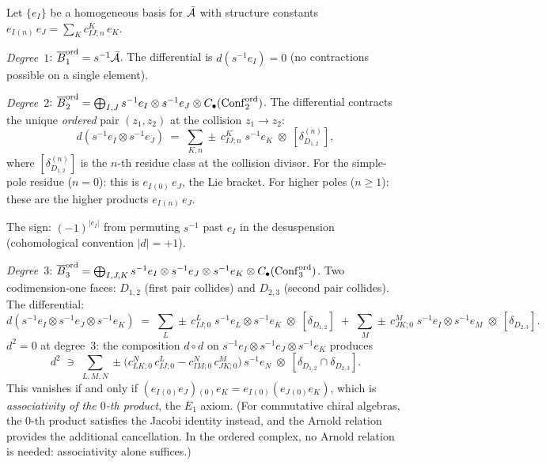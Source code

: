 \begin{construction}
\label{constr:ordered-bar-low-degree}
Let $\{e_I\}$ be a homogeneous basis for $\bar{\mathcal{A}}$ with
structure constants $e_I{}_{(n)}\,e_J=\sum_K c^K_{IJ;n}\,e_K$.

\emph{Degree~$1$}: $\overline{B}^{\mathrm{ord}}_1=s^{-1}\bar{\mathcal{A}}$.
The differential is $d(s^{-1}e_I)=0$ (no contractions
possible on a single element).

\emph{Degree~$2$}: $\overline{B}^{\mathrm{ord}}_2
=\bigoplus_{I,J}s^{-1}e_I\otimes s^{-1}e_J\otimes
C_\bullet(\mathrm{Conf}_2^{\mathrm{ord}})$.
The differential contracts the unique \emph{ordered} pair
$(z_1,z_2)$ at the collision $z_1\to z_2$:
\begin{equation}\label{eq:ordered-bar-d2}
d(s^{-1}e_I\otimes s^{-1}e_J)
\;=\;
\sum_{K,n}\pm\,c^K_{IJ;n}\;s^{-1}e_K
\;\otimes\;
[\delta_{D_{1,2}}^{(n)}],
\end{equation}
where $[\delta_{D_{1,2}}^{(n)}]$ is the $n$-th residue class
at the collision divisor. For the simple-pole residue
($n=0$): this is $e_I{}_{(0)}\,e_J$, the Lie bracket.
For higher poles ($n\ge 1$): these are the higher products
$e_I{}_{(n)}\,e_J$.

The sign: $(-1)^{|e_I|}$ from permuting $s^{-1}$ past
$e_I$ in the desuspension (cohomological convention
$|d|=+1$).

\emph{Degree~$3$}: $\overline{B}^{\mathrm{ord}}_3
=\bigoplus_{I,J,K}s^{-1}e_I\otimes s^{-1}e_J\otimes
s^{-1}e_K\otimes
C_\bullet(\mathrm{Conf}_3^{\mathrm{ord}})$.
Two codimension-one faces: $D_{1,2}$ (first pair collides)
and $D_{2,3}$ (second pair collides). The differential:
\begin{equation}\label{eq:ordered-bar-d3}
d(s^{-1}e_I\otimes s^{-1}e_J\otimes s^{-1}e_K)
\;=\;
\sum_L\pm\,c^L_{IJ;0}\;
s^{-1}e_L\otimes s^{-1}e_K
\;\otimes\;[\delta_{D_{1,2}}]
\;+\;
\sum_M\pm\,c^M_{JK;0}\;
s^{-1}e_I\otimes s^{-1}e_M
\;\otimes\;[\delta_{D_{2,3}}].
\end{equation}
$d^2=0$ at degree~$3$: the composition $d\circ d$ on
$s^{-1}e_I\otimes s^{-1}e_J\otimes s^{-1}e_K$ produces
\[
d^2\;\ni\;
\sum_{L,M,N}\pm\bigl(
c^N_{LK;0}\,c^L_{IJ;0}
-c^N_{IM;0}\,c^M_{JK;0}
\bigr)\,s^{-1}e_N
\;\otimes\;[\delta_{D_{1,2}}\cap\delta_{D_{2,3}}].
\]
This vanishes if and only if
$(e_I{}_{(0)}e_J){}_{(0)}e_K
=e_I{}_{(0)}(e_J{}_{(0)}e_K)$,
which is \emph{associativity of the $0$-th product}, the
$E_1$ axiom. (For commutative chiral algebras, the
$0$-th product satisfies the Jacobi identity instead,
and the Arnold relation provides the additional
cancellation. In the ordered complex, no Arnold relation
is needed: associativity alone suffices.)
\end{construction}

